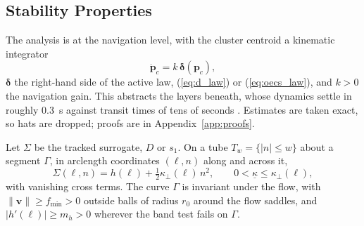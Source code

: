 %

\subsection{Stability Properties}
\label{sec:stability}

The analysis is at the navigation level, with the cluster centroid a
kinematic integrator
\begin{equation}
    \dot{\mathbf{p}}_c = k\,\boldsymbol{\delta}(\mathbf{p}_c),
    \label{eq:kinematic_model}
\end{equation}
$\boldsymbol{\delta}$ the right-hand side of the active law,
(\ref{eq:d_law}) or (\ref{eq:oecs_law}), and $k > 0$ the navigation
gain. This abstracts the layers beneath, whose dynamics settle in
roughly 0.3~s against transit times of tens of seconds \cite{14}.
Estimates are taken exact, so hats are dropped; proofs are in
Appendix~\ref{app:proofs}.

\begin{assumption}
\label{ass:trench}
Let $\Sigma$ be the tracked surrogate, $D$ or $s_1$. On a tube $T_w =
\{|n| \leq w\}$ about a segment $\Gamma$, in arclength coordinates
$(\ell, n)$ along and across it,
\begin{equation}
    \Sigma(\ell, n) = h(\ell)
        + \tfrac{1}{2}\kappa_\perp(\ell)\,n^2,
    \qquad 0 < \underline{\kappa} \leq \kappa_\perp(\ell),
    \label{eq:normal_form}
\end{equation}
with vanishing cross terms. The curve $\Gamma$ is invariant under the
flow, with $\lVert\mathbf{v}\rVert \geq f_{\min} > 0$ outside balls of
radius $r_0$ around the flow saddles, and $|h'(\ell)| \geq m_h > 0$
wherever the band test fails on $\Gamma$.
\end{assumption}

